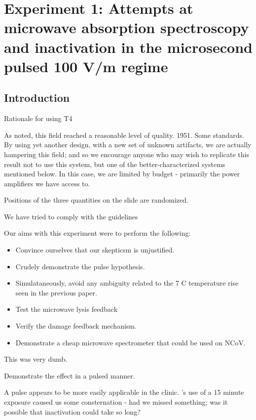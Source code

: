 \documentclass[paper.tex]{subfiles}
\begin{document}
\section{Experiment 1: Attempts at microwave absorption spectroscopy and inactivation in the microsecond pulsed 100 V/m regime}


\subsection{Introduction}



Rationale for using T4


\begin{autem}
As noted, this field reached a reasonable level of quality. 1951. Some standards.
By using yet another design, with a new set of unknown artifacts, we are actually hampering this field;
and so we encourage anyone who may wish to replicate this result not to use this system, but one of the better-characterized systems mentioned below.
In this case, we are limited by budget - primarily the power amplifiers we have access to.
\end{autem}


Positions of the three quantities on the slide are randomized\cite{first2000}.

We have tried to comply with the guidelines

Our aims with this experiment were to perform the following:

\begin{itemize}
	\item Convince ourselves that our skepticsm is unjustified.
	\item Crudely demonstrate the pulse hypothesis.
	\item Simulataneously, avoid any ambiguity related to the 7 C temperature rise seen in the previous paper.
	\item Test the microwave lysis feedback
	\item Verify the damage feedback mechanism.
	\item Demonstrate a cheap microwave spectrometer that could be used on NCoV.
\end{itemize}


This was very dumb.


Demonstrate the effect in a pulsed manner.

A pulse appears to be more easily applicable in the clinic. \cite{Efficient2015}'s use of a 15 minute exposure caused us some consternation
- had we missed something; was it possible that inactivation could take so long?
\end{document}
